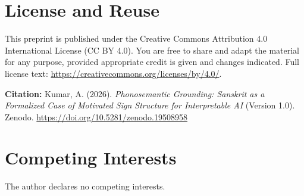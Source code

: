 \documentclass[12pt]{article}
\begin{document}
\section*{License and Reuse}

This preprint is published under the Creative Commons Attribution 4.0 International License (CC BY 4.0). You are free to share and adapt the material for any purpose, provided appropriate credit is given and changes indicated. Full license text: \url{https://creativecommons.org/licenses/by/4.0/}.

\medskip
\noindent\textbf{Citation:} Kumar, A. (2026). \textit{Phonosemantic Grounding: Sanskrit as a Formalized Case of Motivated Sign Structure for Interpretable AI} (Version 1.0). Zenodo. \href{https://doi.org/10.5281/zenodo.19508958}{https://doi.org/10.5281/zenodo.19508958}

\section*{Competing Interests}

The author declares no competing interests.



\end{document}
